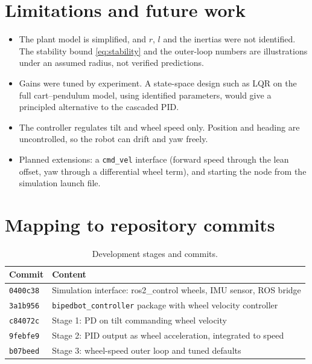 \documentclass[11pt,a4paper]{article}
\begin{document}
\section{Limitations and future work}
\begin{itemize}
  \item The plant model is simplified, and $r$, $l$ and the inertias were not
        identified. The stability bound \eqref{eq:stability} and the outer-loop
        numbers are illustrations under an assumed radius, not verified
        predictions.
  \item Gains were tuned by experiment. A state-space design such as LQR
        on the full cart--pendulum model, using identified parameters, would
        give a principled alternative to the cascaded PID.
  \item The controller regulates tilt and wheel speed only. Position and
        heading are uncontrolled, so the robot can drift and yaw freely.
  \item Planned extensions: a \texttt{cmd\_vel} interface (forward speed through
        the lean offset, yaw through a differential wheel term), and starting
        the node from the simulation launch file.
\end{itemize}

\appendix
\section{Mapping to repository commits}
\begin{table}[ht]
\centering
\caption{Development stages and commits.}
\small
\begin{tabular}{@{}lp{9.6cm}@{}}
\toprule
Commit & Content \\
\midrule
\texttt{0400c38} & Simulation interface: ros2\_control wheels, IMU sensor, ROS bridge \\
\texttt{3a1b956} & \texttt{bipedbot\_controller} package with wheel velocity controller \\
\texttt{c84072c} & Stage 1: PD on tilt commanding wheel velocity \\
\texttt{9febfe9} & Stage 2: PID output as wheel acceleration, integrated to speed \\
\texttt{b07beed} & Stage 3: wheel-speed outer loop and tuned defaults \\
\bottomrule
\end{tabular}
\end{table}
\end{document}
